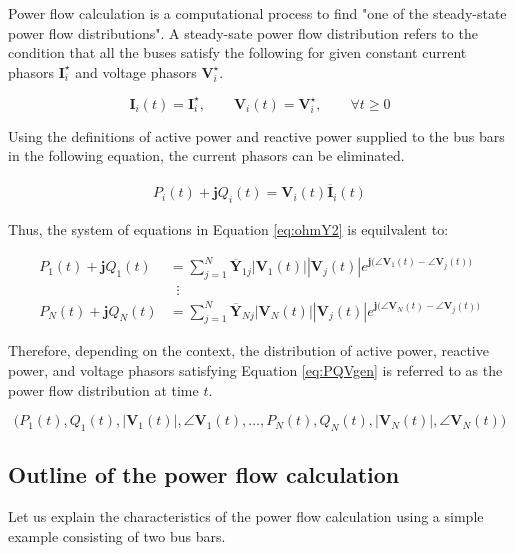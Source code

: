 \documentclass[graybox, envcountchap]{svmult}
\begin{document}
Power flow calculation is a computational process to find "one of the
steady-state power flow distributions". A steady-sate power flow distribution
refers to the condition that all the buses satisfy the following for given
constant current phasors $\bm{I}_i^{\star}$ and voltage phasors
$\bm{V}_i^{\star}$.

\[
  \bm{I}_i(t)=\bm{I}_i^{\star} ,\qquad
  \bm{V}_i(t)=\bm{V}_i^{\star}, \qquad
  \forall t\geq 0
\]

Using the definitions of active power and reactive power supplied to the bus
bars in the following equation, the current phasors can be eliminated.

\begin{align}\label{eq:defPQVIi2}
  P_i(t)+\bm{j}Q_i(t) = \bm{V}_i(t) \overline{\bm{{I}} }_i(t)
\end{align}

Thus, the system of equations in Equation \ref{eq:ohmY2} is equilvalent to:

\begin{equation}\label{eq:PQVgen}
  \begin{aligned}
    P_1(t) + \bm{j} Q_1(t) &= 
    \sum_{j=1}^{N} \overline{\bm{Y}}_{1j} |\bm{V}_1(t)| |\bm{V}_j(t) | e^{\bm{j} \bigl(\angle \bm{V}_1(t) - \angle \bm{V}_j(t) \bigr)} \\ 
    & \; \;  \vdots \\
    P_N(t) + \bm{j} Q_N(t) &= 
    \sum_{j=1}^{N} \overline{\bm{Y}}_{Nj} |\bm{V}_N(t)| |\bm{V}_j(t) | e^{\bm{j} \bigl(\angle \bm{V}_N(t) - \angle \bm{V}_j(t) \bigr)}
  \end{aligned}
\end{equation}

Therefore, depending on the context, the distribution of active power, reactive
power, and voltage phasors satisfying Equation \ref{eq:PQVgen}  is referred to
as the power flow distribution at time $t$.

\begin{equation}\label{eq:pfcon}
  \bigl(
    P_1(t),Q_1(t),|\bm{V}_1(t)|,\angle \bm{V}_1(t),
    \ldots,
    P_N(t),Q_N(t),|\bm{V}_N(t)|,\angle \bm{V}_N(t)
  \bigr)
\end{equation}


\subsection{Outline of the power flow calculation}\label{sec:pfcal}

Let us explain the characteristics of the power flow calculation using a simple
example consisting of two bus bars.
\end{document}
